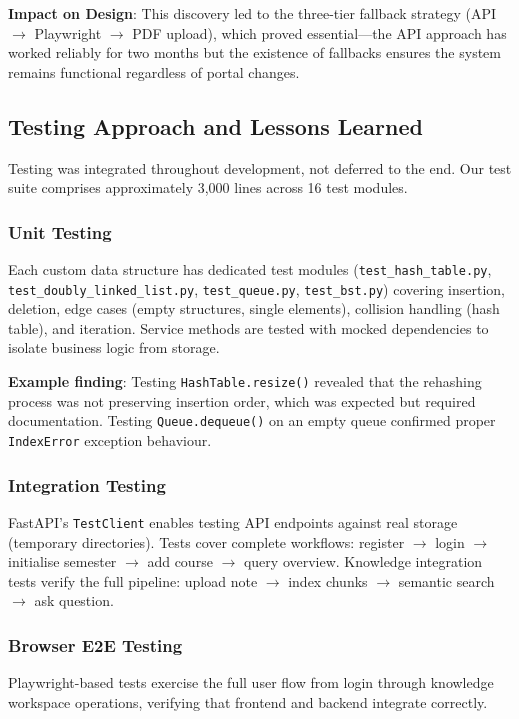 \documentclass[11pt,a4paper]{article}
\begin{document}
\textbf{Impact on Design}: This discovery led to the three-tier fallback strategy (API $\rightarrow$ Playwright $\rightarrow$ PDF upload), which proved essential---the API approach has worked reliably for two months but the existence of fallbacks ensures the system remains functional regardless of portal changes.

\subsection{Testing Approach and Lessons Learned}
Testing was integrated throughout development, not deferred to the end. Our test suite comprises approximately 3,000 lines across 16 test modules.

\subsubsection{Unit Testing}
Each custom data structure has dedicated test modules (\texttt{test\_hash\_table.py}, \texttt{test\_doubly\_linked\_list.py}, \texttt{test\_queue.py}, \texttt{test\_bst.py}) covering insertion, deletion, edge cases (empty structures, single elements), collision handling (hash table), and iteration. Service methods are tested with mocked dependencies to isolate business logic from storage.

\textbf{Example finding}: Testing \texttt{HashTable.resize()} revealed that the rehashing process was not preserving insertion order, which was expected but required documentation. Testing \texttt{Queue.dequeue()} on an empty queue confirmed proper \texttt{IndexError} exception behaviour.

\subsubsection{Integration Testing}
FastAPI's \texttt{TestClient} enables testing API endpoints against real storage (temporary directories). Tests cover complete workflows: register $\rightarrow$ login $\rightarrow$ initialise semester $\rightarrow$ add course $\rightarrow$ query overview. Knowledge integration tests verify the full pipeline: upload note $\rightarrow$ index chunks $\rightarrow$ semantic search $\rightarrow$ ask question.

\subsubsection{Browser E2E Testing}
Playwright-based tests exercise the full user flow from login through knowledge workspace operations, verifying that frontend and backend integrate correctly.
\end{document}
